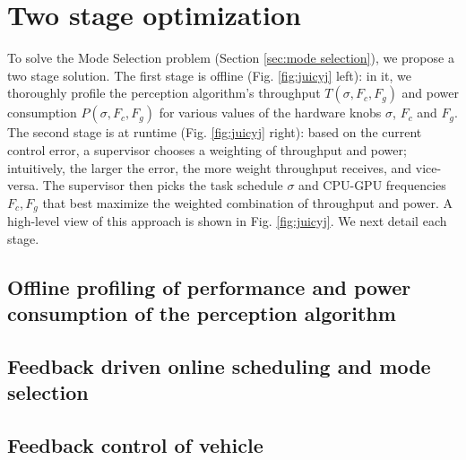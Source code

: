 \section{Two stage optimization}
\label{sec:twoStage}
To solve the Mode Selection problem (Section \ref{sec:mode selection}), we propose a two stage solution. 
The first stage is offline (Fig. \ref{fig:juicyj} left): in it, we thoroughly profile the perception algorithm's throughput $T(\sigma,F_c,F_g)$ and power consumption $P(\sigma,F_c,F_g)$ for various values of the hardware knobs $\sigma$, $F_c$ and $F_g$. 
The second stage is at runtime (Fig. \ref{fig:juicyj} right): based on the current control error, a supervisor chooses a weighting of throughput and power; intuitively, the larger the error, the more weight throughput receives, and vice-versa.
The supervisor then picks the task schedule $\sigma$ and CPU-GPU frequencies $F_c,F_g$ that best maximize the weighted combination of throughput and power.
A high-level view of this approach is shown in Fig. \ref{fig:juicyj}. 
We next detail each stage.

\subsection{Offline profiling of performance and power consumption of the perception algorithm}
\label{sec:profiling}


\subsection{Feedback driven online scheduling and mode selection}
\label{sec:scheduling}


\subsection{Feedback control of vehicle}
\label{sec:evaluation}

